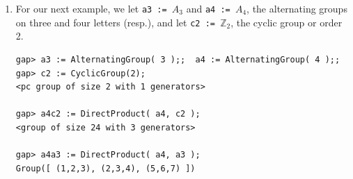 \documentclass[11pt]{amsart}
\newcommand{\gap}{GAP}   %
\theoremstyle{plain}
\newcommand{\codesize}{\footnotesize}
\newcommand{\<}{\ensuremath{\langle}}
\renewcommand{\>}{\ensuremath{\rangle}}
\newcommand{\Sub}{\ensuremath{\mathrm{Sub}}}
\newcommand{\Z}{\ensuremath{\mathbb{Z}}}
\begin{document}
\begin{enumerate}
In the lattice in Figure~\ref{fig:s3a3}, the
subgroup of index two is the normal subgroup $A_3 \times A_3$. 
Now, $A_3$ has no proper nontrivial subgroups (and thus $\Sub[A_3]$ is just the
two element chain).  Nonetheless, it is clear from the diagram that the subgroup
lattice $\Sub[A_3 \times A_3]$ is isomorphic to $M_4$ (cf.~$\Sub[\Z_2 \times \Z_2]
\cong M_3$).
\\[6pt]
{\bf Remark:} $\Sub[A_3 \times A_3] \cong M_4 \cong \Sub[S_3]$.  Indeed,
\begin{itemize}
\item It is well-known that $\Sub[G]\cong M_4$ iff $G$ is (isomorphic to) $C_3\times C_3$ or $D_3$.
\item  $S_3$ is isomorphic to the dihedral group $D_3$ of order 6, the symmetries of
  an equilateral triangle (three reflections and three rotations; some authors refer
  to $D_3$ as $D_6$.)  We can easily check by hand that $S_3 \cong D_3$, but \gap\
  quickly confirms this fact as follows:
{\codesize
\begin{verbatim}
gap> s3 := SymmetricGroup(3);    # returns Sym( [ 1 .. 3 ] )
gap> d3 := DihedralGroup(6);     # returns <pc group of size 6 with 2 generators>
gap> IsDihedralGroup(s3);        # returns true
\end{verbatim}}
\item $A_3$ is isomorphic to $C_3$.  This is obvious, but let's check it anyway using GAP:
{\codesize
\begin{verbatim}
gap> a3 := AlternatingGroup(3);  # returns Alt( [ 1 .. 3 ] )
gap> Elements(a3);               # returns [ (), (1,2,3), (1,3,2) ]
gap> IsCyclic(a3);               # returns true

\end{verbatim}}
\end{itemize}

\item For our next example, we let {\tt a3 := $A_3$} and {\tt a4 := $A_4$}, the
alternating groups on three and four letters (resp.), and let 
{\tt c2 := $\Z_2$}, the cyclic group or order 2. 
{\codesize
\begin{verbatim}
gap> a3 := AlternatingGroup( 3 );;  a4 := AlternatingGroup( 4 );;
gap> c2 := CyclicGroup(2);
<pc group of size 2 with 1 generators>

gap> a4c2 := DirectProduct( a4, c2 );
<group of size 24 with 3 generators>

gap> a4a3 := DirectProduct( a4, a3 );
Group([ (1,2,3), (2,3,4), (5,6,7) ])


\end{verbatim}}
\end{enumerate}
\end{document}
